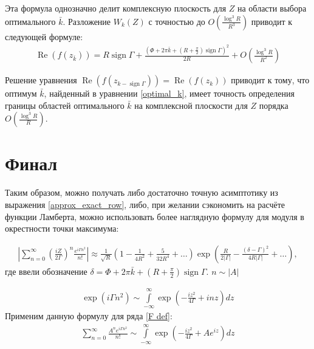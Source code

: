 \documentclass[a4paper, 12pt]{article}
\DeclareMathOperator*{\sign}{sign}
\DeclareMathOperator*{\Real}{Re}
\newenvironment{eqw}{\begin{equation} \begin{aligned}}   
    {\end{aligned}    \end{equation}}
\begin{document}
Эта формула однозначно делит комплексную плоскость для $Z$ на области выбора оптимального $\bar k$. Разложение $W_{k}(Z)$ с точностью до $O\left(\frac{\log^3 R}{R^3}\right)$ приводит к следующей формуле:
\begin{eqw}
    \Real(f(z_{\bar k})) =  R\sign \Gamma + \frac{\left(\Phi + 2\pi \bar k +  \left(R+\frac{\pi}{2} \right)\sign\Gamma\right)^2}{2R} +
     O\left(\frac{\log^3 R}{R^2}\right)
\end{eqw}

Решение уравнения $\Real(f(z_{k-\sign \Gamma})) = \Real(f(z_{k}))$ приводит к тому, что оптимум $\bar k$, найденный в уравнении \eqref{optimal_k}, имеет точность определения границы областей оптимального $\bar k$ на комплексной плоскости для $Z$ порядка $O\left(\frac{\log^3 R}{R}\right)$.

\section*{Финал}
Таким образом, можно получать либо достаточно точную асимптотику из выражения \eqref{approx_exact_row}, либо, при желании сэкономить на расчёте функции Ламберта, можно использовать более наглядную формулу для модуля в окрестности точки максимума:

\begin{eqw}
    \left|\sum\limits_{n=0}^{\infty}\left(\frac{iZ}{2\Gamma}\right)^n  \frac{e^{i\Gamma n^2}}{n!} \right|\approx 
    \frac{1}{\sqrt{R}}\left(1-\frac{1}{4 R^2} + \frac{5}{32 R^4}+\dots\right)
    \exp\left(\frac{R}{2|\Gamma|} - \frac{\left(\delta -\Gamma\right)^2}{4R|\Gamma|}+\dots\right),
\end{eqw}
где ввели обозначение $\delta = \Phi + 2\pi \bar k +  \left(R+\frac{\pi}{2} \right)\sign\Gamma$. $n\sim\left|{A}\right|$

\begin{eqw}
    \exp\left(i\Gamma n^2\right) \sim
    \int\limits_{-\infty}^{\infty} \exp\left(-\frac{i z^2}{4\Gamma} + i n z\right) dz
\end{eqw}
Применим данную формулу для ряда \eqref{F def}:
\begin{eqw}
    \sum\limits_{n=0}^{\infty} \frac{A^n e^{i\Gamma n^2}}{n!} \sim
    \int\limits_{-\infty}^{\infty} \exp\left(-\frac{i z^2}{4\Gamma} +  A e^{iz}\right) dz
\end{eqw}
\nocite{*}

\end{document}
